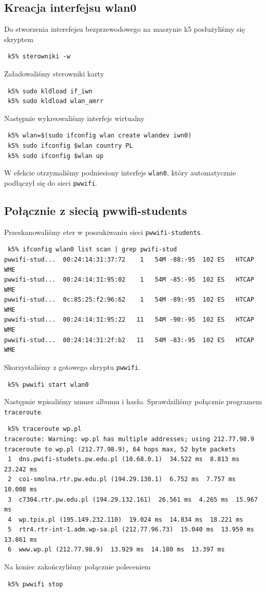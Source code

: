 \documentclass[a4paper,11pt,notitlepage]{article}
\begin{document}
\subsection{Kreacja interfejsu wlan0}

Do stworzenia interefejsu bezprzewodowego na maszynie k5 posłużyliśmy się skryptem 
\begin{verbatim}
 k5% sterowniki -w
\end{verbatim}
Załadowaliśmy sterowniki karty 
\begin{verbatim}
 k5% sudo kldload if_iwn
 k5% sudo kldload wlan_amrr
\end{verbatim}
Następnie wykreowaliśmy interfejs wirtualny
\begin{verbatim}
 k5% wlan=$(sudo ifconfig wlan create wlandev iwn0)
 k5% sudo ifconfig $wlan country PL
 k5% sudo ifconfig $wlan up
\end{verbatim}
W efekcie otrzymaliśmy podniesiony interfejs \verb+wlan0+, który automatycznie podłączył się do sieci \verb+pwwifi+.

\subsection{Połącznie z siecią pwwifi-students}

Przeskanowaliśmy eter w poszukiwaniu sieci \verb+pwwifi-students+.
\begin{verbatim}
 k5% ifconfig wlan0 list scan | grep pwifi-stud
pwwifi-stud...  00:24:14:31:37:72    1   54M -88:-95  102 ES   HTCAP WME
pwwifi-stud...  00:24:14:31:95:02    1   54M -85:-95  102 ES   HTCAP WME
pwwifi-stud...  0c:85:25:f2:96:62    1   54M -89:-95  102 ES   HTCAP WME
pwwifi-stud...  00:24:14:31:95:22   11   54M -90:-95  102 ES   HTCAP WME
pwwifi-stud...  00:24:14:31:2f:b2   11   54M -83:-95  102 ES   HTCAP WME
\end{verbatim}
Skorzystaliśmy z gotowego skryptu \verb+pwwifi+. 
\begin{verbatim}
 k5% pwwifi start wlan0
\end{verbatim}
Następnie wpisaliśmy numer albumu i hasło. Sprawdziliśmy połącznie programem \verb+traceroute+.
\begin{verbatim}
 k5% traceroute wp.pl
traceroute: Warning: wp.pl has multiple addresses; using 212.77.98.9
traceroute to wp.pl (212.77.98.9), 64 hops max, 52 byte packets
 1  dns.pwifi-studets.pw.edu.pl (10.68.0.1)  34.522 ms  8.813 ms  23.242 ms
 2  coi-smolna.rtr.pw.edu.pl (194.29.130.1)  6.752 ms  7.757 ms  10.008 ms
 3  c7304.rtr.pw.edu.pl (194.29.132.161)  26.561 ms  4.265 ms  15.967 ms
 4  wp.tpix.pl (195.149.232.110)  19.024 ms  14.834 ms  18.221 ms
 5  rtr4.rtr-int-1.adm.wp-sa.pl (212.77.96.73)  15.040 ms  13.959 ms  13.861 ms
 6  www.wp.pl (212.77.98.9)  13.929 ms  14.180 ms  13.397 ms
\end{verbatim}
Na koniec zakończyliśmy połącznie poleceniem
\begin{verbatim}
 k5% pwwifi stop
\end{verbatim}
\end{document}
